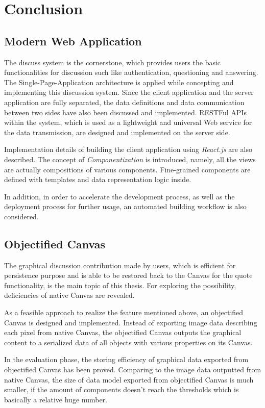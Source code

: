 \section{Conclusion}

\subsection{Modern Web Application}

The discuss system is the cornerstone, which provides users the basic functionalities for discussion such like authentication, questioning and answering. The Single-Page-Application architecture is applied while concepting and implementing this discussion system. Since the client application and the server application are fully separated, the data definitions and data communication between two sides have also been discussed and implemented. RESTFul APIs within the system, which is used as a lightweight and universal Web service for the data transmission, are designed and implemented on the server side.

Implementation details of building the client application using \textit{React.js} are also described. The concept of \textit{Componentization} is introduced, namely, all the views are actually compositions of various components. Fine-grained components are defined with templates and data representation logic inside.

In addition, in order to accelerate the development process, as well as the deployment process for further usage, an automated building workflow is also considered. 


\subsection{Objectified Canvas}

The graphical discussion contribution made by users, which is efficient for persistence purpose and is able to be restored back to the Canvas for the quote functionality, is the main topic of this thesis. For exploring the possibility, deficiencies of native Canvas are revealed. 

As a feasible approach to realize the feature mentioned above, an objectified Canvas is designed and implemented. Instead of exporting image data describing each pixel from native Canvas, the objectified Canvas outputs the graphical content to a serialized data  of all objects with various properties on its Canvas. 

In the evaluation phase, the storing efficiency of graphical data exported from objectified Canvas has been proved. Comparing to the image data outputted from native Canvas, the size of data model exported from objectified Canvas is much smaller, if the amount of components doesn't reach the thresholds which is basically a relative huge number.

